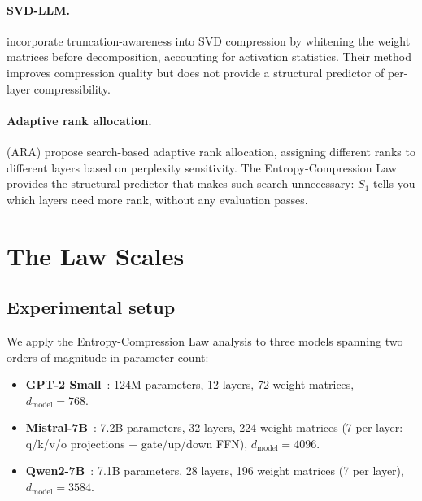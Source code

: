 \documentclass[11pt,a4paper]{article}
\newcommand{\Svn}{S_1}
\begin{document}
\paragraph{SVD-LLM.}
\citet{Wang2024svd} incorporate truncation-awareness into SVD
compression by whitening the weight matrices before decomposition,
accounting for activation statistics.  Their method improves
compression quality but does not provide a structural predictor of
per-layer compressibility.

\paragraph{Adaptive rank allocation.}
\citet{Sun2025ara} (ARA) propose search-based adaptive rank
allocation, assigning different ranks to different layers based on
perplexity sensitivity.  The Entropy-Compression Law provides the
structural predictor that makes such search unnecessary: $\Svn$ tells
you which layers need more rank, without any evaluation passes.


\section{The Law Scales}
\label{sec:law-scales}

\subsection{Experimental setup}
\label{sec:scale-setup}

We apply the Entropy-Compression Law analysis to three models
spanning two orders of magnitude in parameter count:

\begin{itemize}[leftmargin=2em, itemsep=2pt]
  \item \textbf{GPT-2 Small}~\citep{Radford2019}: 124M parameters,
    12 layers, 72 weight matrices, $d_{\text{model}} = 768$.
  \item \textbf{Mistral-7B}~\citep{jiang2023mistral}: 7.2B
    parameters, 32 layers, 224 weight matrices (7 per layer:
    q/k/v/o projections + gate/up/down FFN),
    $d_{\text{model}} = 4096$.
  \item \textbf{Qwen2-7B}~\citep{yang2024qwen2}: 7.1B parameters,
    28 layers, 196 weight matrices (7 per layer),
    $d_{\text{model}} = 3584$.
\end{itemize}
\end{document}
